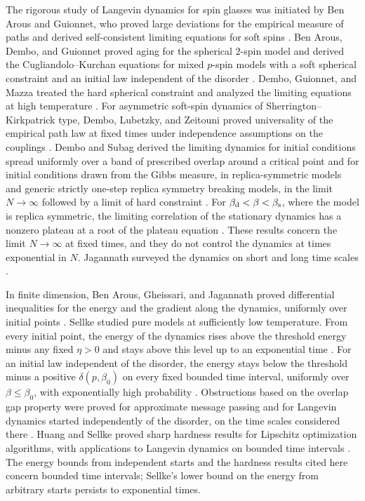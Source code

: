 The rigorous study of Langevin dynamics for spin glasses was initiated by Ben Arous and Guionnet, who proved large deviations for the empirical measure of paths and derived self-consistent limiting equations for soft spins \cite{BenArousGuionnet1995,BenArousGuionnet1997}. Ben Arous, Dembo, and Guionnet proved aging for the spherical $2$-spin model \cite{BenArousDemboGuionnet2001} and derived the Cugliandolo--Kurchan equations for mixed $p$-spin models with a soft spherical constraint and an initial law independent of the disorder \cite{BenArousDemboGuionnet2006}. Dembo, Guionnet, and Mazza treated the hard spherical constraint and analyzed the limiting equations at high temperature \cite{DemboGuionnetMazza2007}. For asymmetric soft-spin dynamics of Sherrington--Kirkpatrick type, Dembo, Lubetzky, and Zeitouni proved universality of the empirical path law at fixed times under independence assumptions on the couplings \cite{DemboLubetzkyZeitouni2021}. Dembo and Subag derived the limiting dynamics for initial conditions spread uniformly over a band of prescribed overlap around a critical point \cite{DemboSubag2020} and for initial conditions drawn from the Gibbs measure, in replica-symmetric models and generic strictly one-step replica symmetry breaking models, in the limit $N\to\infty$ followed by a limit of hard constraint \cite{DemboSubag2025}. For $\beta_{\mathrm d}<\beta<\beta_{\mathrm s}$, where the model is replica symmetric, the limiting correlation of the stationary dynamics has a nonzero plateau at a root of the plateau equation \cite[Proposition~1.14 and Corollary~1.18]{DemboSubag2025}.
These results concern the limit $N\to\infty$ at fixed times, and they do not control the dynamics at times exponential in $N$. Jagannath surveyed the dynamics on short and long time scales \cite{Jagannath2019}.

In finite dimension, Ben Arous, Gheissari, and Jagannath proved differential inequalities for the energy and the gradient along the dynamics, uniformly over initial points \cite{BenArousGheissariJagannath2020}. Sellke studied pure models at sufficiently low temperature. From every initial point, the energy of the dynamics rises above the threshold energy minus any fixed $\eta>0$ and stays above this level up to an exponential time \cite[Theorem~1.1]{Sellke2024}. For an initial law independent of the disorder, the energy stays below the threshold minus a positive $\delta(p,\beta_0)$ on every fixed bounded time interval, uniformly over $\beta\le\beta_0$, with exponentially high probability \cite[Theorem~1.7]{Sellke2024}. Obstructions based on the overlap gap property were proved for approximate message passing \cite{GamarnikJagannath2021} and for Langevin dynamics started independently of the disorder, on the time scales considered there \cite{GamarnikJagannathWein2024}. Huang and Sellke proved sharp hardness results for Lipschitz optimization algorithms, with applications to Langevin dynamics on bounded time intervals \cite{HuangSellke2025}. The energy bounds from independent starts and the hardness results cited here concern bounded time intervals; Sellke's lower bound on the energy from arbitrary starts persists to exponential times.

